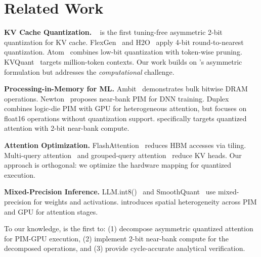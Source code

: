 \section{Related Work}

\textbf{KV Cache Quantization.} \kivi{}~\cite{kivi} is the first tuning-free asymmetric 2-bit quantization for KV cache.
FlexGen~\cite{flexgen} and H2O~\cite{h2o} apply 4-bit round-to-nearest quantization.
Atom~\cite{zhao2024atom} combines low-bit quantization with token-wise pruning.
KVQuant~\cite{hooper2024kvquant} targets million-token contexts.
Our work builds on \kivi{}'s asymmetric formulation but addresses the \emph{computational} challenge.

\textbf{Processing-in-Memory for ML.} Ambit~\cite{seshadri2017ambit} demonstrates bulk bitwise DRAM operations.
Newton~\cite{newton2021newton} proposes near-bank PIM for DNN training.
Duplex~\cite{duplex} combines logic-die PIM with GPU for heterogeneous attention, but focuses on float16 operations without quantization support.
\pimattn{} specifically targets quantized attention with 2-bit near-bank compute.

\textbf{Attention Optimization.} FlashAttention~\cite{dao2022flashattention} reduces HBM accesses via tiling.
Multi-query attention~\cite{mqa} and grouped-query attention~\cite{gqa} reduce KV heads.
Our approach is orthogonal: we optimize the hardware mapping for quantized execution.

\textbf{Mixed-Precision Inference.} LLM.int8()~\cite{dettmers2022llmint8} and SmoothQuant~\cite{xiao2023smoothquant} use mixed-precision for weights and activations.
\pimattn{} introduces spatial heterogeneity across PIM and GPU for attention stages.

To our knowledge, \pimattn{} is the first to: (1) decompose asymmetric quantized attention for PIM-GPU execution, (2) implement 2-bit near-bank compute for the decomposed operations, and (3) provide cycle-accurate analytical verification.
